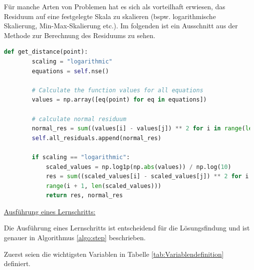 \documentclass{article}
\theoremstyle{newline}
\begin{document}
\begin{onehalfspace}
Für manche Arten von Problemen hat es sich als vorteilhaft erwiesen, das Residuum auf eine festgelegte Skala zu skalieren (bspw. logarithmische Skalierung, Min-Max-Skalierung etc.). Im folgenden ist ein Ausschnitt aus der Methode zur Berechnung des Residuums zu sehen.

\begin{lstlisting}[language=Python, caption={Berechnung des Residuums}, label={lst:python}]
	def get_distance(point):
		scaling = "logarithmic"
		equations = self.nse()
		
		# Calculate the function values for all equations
		values = np.array([eq(point) for eq in equations])
		
		# calculate normal residuum
		normal_res = sum((values[i] - values[j]) ** 2 for i in range(len(values)) for j in range(i + 1, len(values)))
		self.all_residuals.append(normal_res)
		
		if scaling == "logarithmic":
			scaled_values = np.log1p(np.abs(values)) / np.log(10)
			res = sum((scaled_values[i] - scaled_values[j]) ** 2 for i in range(len(scaled_values)) for j in
			range(i + 1, len(scaled_values)))
			return res, normal_res		
\end{lstlisting}
\bigskip

\underline{Ausführung eines Lernschritts:}
\smallskip

Die Ausführung eines Lernschritts ist entscheidend für die Lösungsfindung und ist genauer in Algorithmus \ref{algo:step} beschrieben.

Zuerst seien die wichtigsten Variablen in Tabelle \ref{tab:Variablendefinition} definiert.


\end{onehalfspace}
\end{document}
